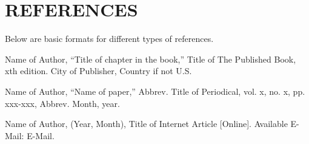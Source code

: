 \documentclass[letterpaper, 10 pt, conference]{IEEEconf}
\begin{document}
\section*{REFERENCES}

Below are basic formats for different types of references.

\begin{enumerate}[label={[\arabic*]}]
\item Name of Author, ``Title of chapter in the book,''
Title of The Published Book, xth edition. City of
Publisher, Country if not U.S.
\item Name of Author, “Name of paper,” Abbrev.
Title of Periodical, vol. x, no. x, pp. xxx-xxx,
Abbrev. Month, year.
\item Name of Author, (Year, Month),
Title of Internet Article [Online]. Available E-Mail:
E-Mail.
\end{enumerate}
\end{document}
